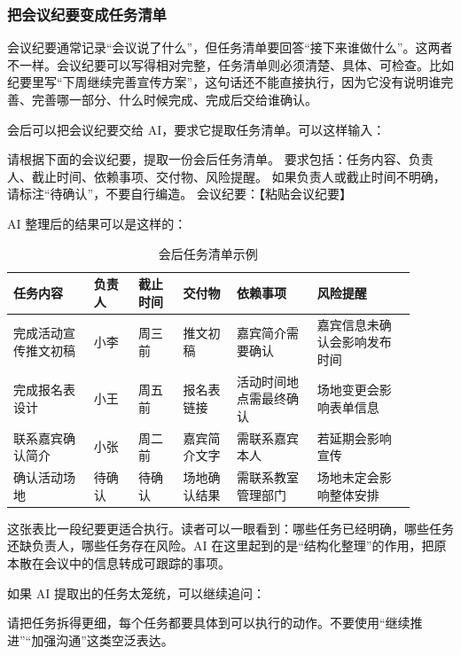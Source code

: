\subsubsection*{把会议纪要变成任务清单}

会议纪要通常记录“会议说了什么”，但任务清单要回答“接下来谁做什么”。这两者不一样。会议纪要可以写得相对完整，任务清单则必须清楚、具体、可检查。比如纪要里写“下周继续完善宣传方案”，这句话还不能直接执行，因为它没有说明谁完善、完善哪一部分、什么时候完成、完成后交给谁确认。

会后可以把会议纪要交给 AI，要求它提取任务清单。可以这样输入：

\begin{tcolorbox}[promptbox]
请根据下面的会议纪要，提取一份会后任务清单。
要求包括：任务内容、负责人、截止时间、依赖事项、交付物、风险提醒。
如果负责人或截止时间不明确，请标注“待确认”，不要自行编造。
会议纪要：【粘贴会议纪要】
\end{tcolorbox}

AI 整理后的结果可以是这样的：

\begin{table}[H]
\centering
\caption{会后任务清单示例}
\label{tab:post-meeting-task-list-example}
\begin{tabular}{p{0.18\linewidth} p{0.10\linewidth} p{0.10\linewidth} p{0.12\linewidth} p{0.18\linewidth} p{0.22\linewidth}}
\toprule
\textbf{任务内容} & \textbf{负责人} & \textbf{截止时间} & \textbf{交付物} & \textbf{依赖事项} & \textbf{风险提醒} \\
\midrule
完成活动宣传推文初稿 & 小李 & 周三前 & 推文初稿 & 嘉宾简介需要确认 & 嘉宾信息未确认会影响发布时间 \\
完成报名表设计 & 小王 & 周五前 & 报名表链接 & 活动时间地点需最终确认 & 场地变更会影响表单信息 \\
联系嘉宾确认简介 & 小张 & 周二前 & 嘉宾简介文字 & 需联系嘉宾本人 & 若延期会影响宣传 \\
确认活动场地 & 待确认 & 待确认 & 场地确认结果 & 需联系教室管理部门 & 场地未定会影响整体安排 \\
\bottomrule
\end{tabular}
\end{table}

这张表比一段纪要更适合执行。读者可以一眼看到：哪些任务已经明确，哪些任务还缺负责人，哪些任务存在风险。AI 在这里起到的是“结构化整理”的作用，把原本散在会议中的信息转成可跟踪的事项。

如果 AI 提取出的任务太笼统，可以继续追问：

\begin{tcolorbox}[promptbox]
请把任务拆得更细，每个任务都要具体到可以执行的动作。不要使用“继续推进”“加强沟通”这类空泛表达。
\end{tcolorbox}

